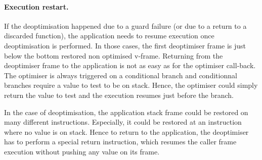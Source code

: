 \documentclass[a4paper,12pt,twoside]{../includes/ThesisStyle}
\begin{document}
\paragraph{Execution restart.}

If the deoptimisation happened due to a guard failure (or due to a return to a discarded function), the application needs to resume execution once deoptimisation is performed. In those cases, the first deoptimiser frame is just below the bottom restored non optimised v-frame. Returning from the deoptimiser frame to the application is not as easy as for the optimiser call-back. The optimiser is always triggered on a conditional branch and conditionnal branches require a value to test to be on stack. Hence, the optimiser could simply return the value to test and the execution resumes just before the branch. 

In the case of deoptimisation, the application stack frame could be restored on many different instructions. Especially, it could be restored at an instruction where no value is on stack. Hence to return to the application, the deoptimiser has to perform a special return instruction, which resumes the caller frame execution without pushing any value on its frame.




\ifx\wholebook\relax\else
    
\end{document}
